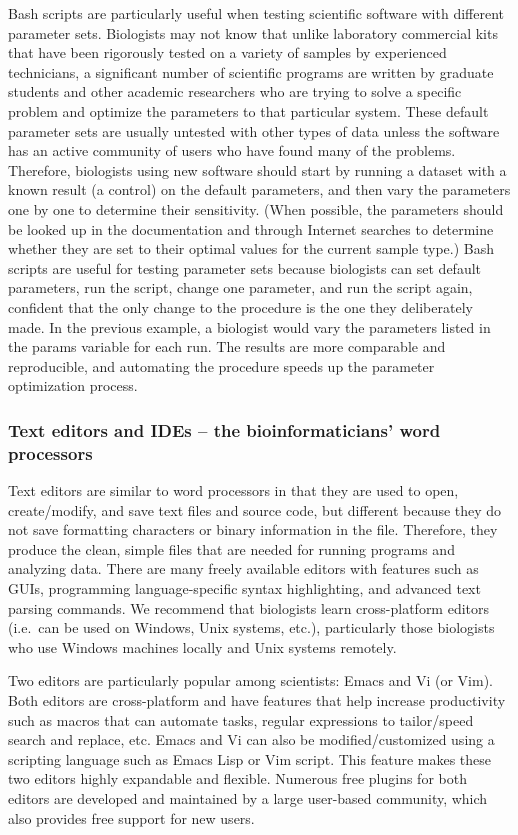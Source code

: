 \documentclass[ChapterTOCs,krantz2]{krantz} %
\begin{document}
Bash scripts are particularly useful when testing scientific software with
different parameter sets.  Biologists may not know that
unlike laboratory commercial kits that have been rigorously tested on a
variety of samples by experienced technicians, a significant
number of scientific programs are written by graduate students and other
academic researchers who are trying to solve a specific problem and optimize
the parameters to that particular system.  These default parameter sets are
usually untested with other types of data unless the software
has an active community of users who
have found many of the problems.  Therefore, biologists using new
software should start by running a dataset with a known result (a control) on
the default parameters, and then vary the parameters one by one to determine
their sensitivity.  (When possible, the parameters should be looked up in the
documentation and through Internet searches to determine whether they are set
to their optimal values for the current sample type.)  Bash scripts are useful
for testing parameter sets because biologists can set default parameters, run
the script, change one parameter, and run the script again, confident that the
only change to the procedure is the one they deliberately made.  In the
previous example, a biologist would vary the parameters listed in the params
variable for each run.  The results are more comparable and reproducible, and
automating the procedure speeds up the parameter optimization process.

\subsubsection{Text editors and IDEs -- the bioinformaticians' word processors}

Text editors are 
similar to word processors in that they are used to open,
create/modify, and save text files and source code, but different because they
do not save formatting characters or binary information in the file.
Therefore, they produce the clean, simple files that are needed for running programs
and analyzing data.  There are many freely available editors with features such
as GUIs, programming language-specific syntax
highlighting, and advanced text parsing commands. 
We recommend that biologists learn cross-platform editors
(i.e.\ can be used on Windows, Unix systems, etc.), particularly
those biologists who use Windows machines locally and Unix systems
remotely.

Two editors are particularly popular among scientists: Emacs and Vi (or Vim).
Both editors are cross-platform and have features that help increase productivity
such as macros that can automate tasks, regular expressions to 
tailor/speed search and replace, etc.
Emacs and Vi can also be modified/customized using 
a scripting language such as Emacs Lisp or Vim script.
This feature makes these two editors highly expandable and flexible.
Numerous free plugins for both editors are developed and maintained by a
large user-based community, which also provides free support for new users.
\end{document}

